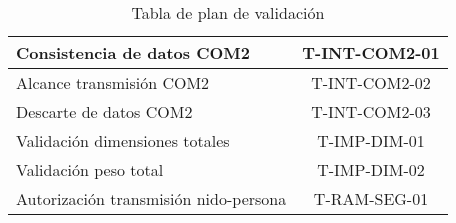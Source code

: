\begin{table}[H]
\begin{tabular}{|l|c|}
Consistencia de datos COM2                & T-INT-COM2-01 \\ \hline
Alcance transmisión COM2                  & T-INT-COM2-02 \\ \hline
Descarte de datos COM2                    & T-INT-COM2-03 \\ \hline
Validación dimensiones totales            & T-IMP-DIM-01  \\ \hline
Validación peso total                     & T-IMP-DIM-02  \\ \hline
Autorización transmisión nido-persona     & T-RAM-SEG-01  \\ \hline
\end{tabular}
\caption{Tabla de plan de validación}
\end{table}
